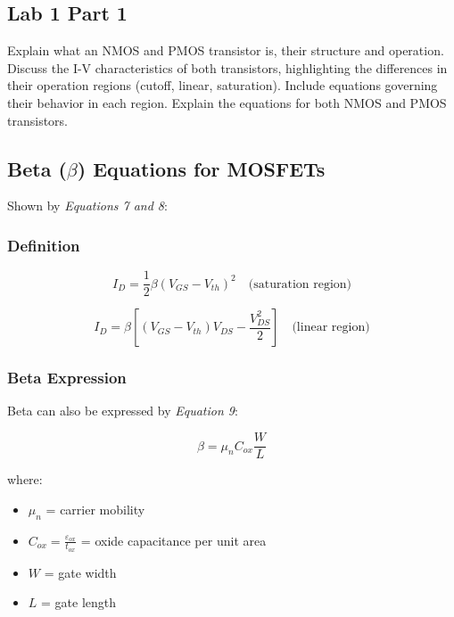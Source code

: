 \documentclass[a4paper,12pt]{article}
\begin{document}
\subsection{Lab 1 Part 1}

Explain what an NMOS and PMOS transistor is, their structure and operation. 
Discuss the I-V characteristics of both transistors, 
highlighting the differences in their operation regions (cutoff, linear, saturation). 
Include equations governing their behavior in each region.
Explain the equations for both NMOS and PMOS transistors.


\subsection{Beta ($\beta$) Equations for MOSFETs}

Shown by \textit{Equations 7 and 8}:

\subsubsection{Definition}
\begin{equation}
I_D = \frac{1}{2}\beta(V_{GS} - V_{th})^2 \quad \text{(saturation region)}    
\end{equation}

\begin{equation}
I_D = \beta\left[(V_{GS} - V_{th})V_{DS} - \frac{V_{DS}^2}{2}\right] \quad \text{(linear region)}
\end{equation}

\subsubsection{Beta Expression}

Beta can also be expressed by \textit{Equation 9}:

\begin{equation}
\boxed{\beta = \mu_n C_{ox} \frac{W}{L}}
\end{equation}

where:
\begin{itemize}
    \item $\mu_n$ = carrier mobility
    \item $C_{ox} = \frac{\varepsilon_{ox}}{t_{ox}}$ = oxide capacitance per unit area
    \item $W$ = gate width
    \item $L$ = gate length
\end{itemize}
\end{document}
